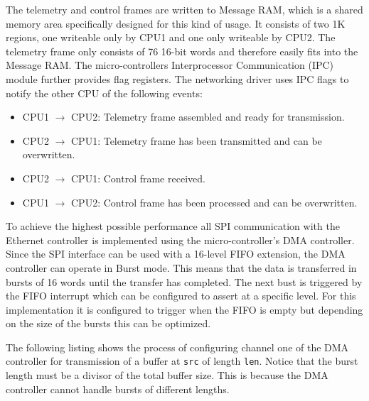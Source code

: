 The telemetry and control frames are written to Message RAM, which is a shared memory area specifically designed for this kind of usage. It consists of two 1K regions, one writeable only by CPU1 and one only writeable by CPU2. The telemetry frame only consists of 76 16-bit words and therefore easily fits into the Message RAM. The micro-controllers Interprocessor Communication (IPC) module further provides flag registers. The networking driver uses IPC flags to notify the other CPU of the following events:

\begin{itemize}
    \item CPU1 $\rightarrow$ CPU2: Telemetry frame assembled and ready for transmission.
    \item CPU2 $\rightarrow$ CPU1: Telemetry frame has been transmitted and can be overwritten.
    \item CPU2 $\rightarrow$ CPU1: Control frame received.
    \item CPU1 $\rightarrow$ CPU2: Control frame has been processed and can be overwritten.
\end{itemize}

To achieve the highest possible performance all SPI communication with the Ethernet controller is implemented using the micro-controller's DMA controller. Since the SPI interface can be used with a 16-level FIFO extension, the DMA controller can operate in Burst mode. This means that the data is transferred in bursts of 16 words until the transfer has completed. The next bust is triggered by the FIFO interrupt which can be configured to assert at a specific level. For this implementation it is configured to trigger when the FIFO is empty but depending on the size of the bursts this can be optimized.

The following listing shows the process of configuring channel one of the DMA controller for transmission of a buffer at \texttt{src} of length \texttt{len}. Notice that the burst length must be a divisor of the total buffer size. This is because the DMA controller cannot handle bursts of different lengths.

